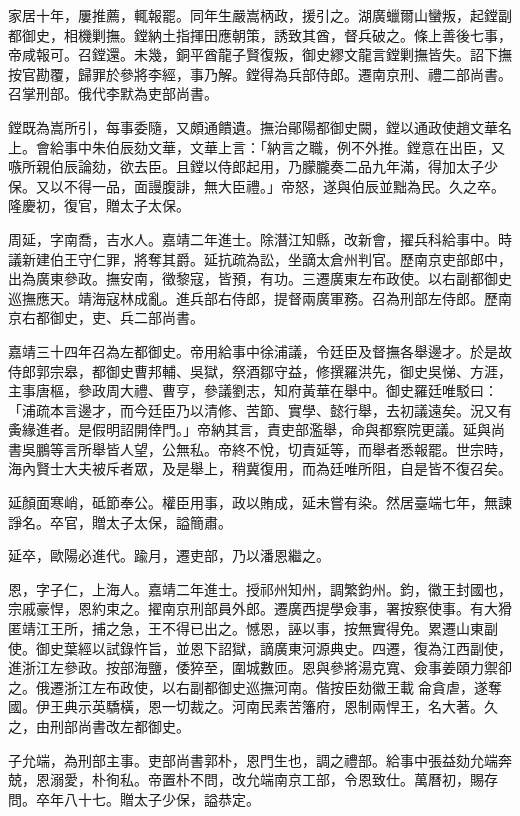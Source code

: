 \begin{pinyinscope}
家居十年，屢推薦，輒報罷。同年生嚴嵩柄政，援引之。湖廣蠟爾山蠻叛，起鏜副都御史，相機剿撫。鏜納土指揮田應朝策，誘致其酋，督兵破之。條上善後七事，帝咸報可。召鏜還。未幾，銅平酋龍子賢復叛，御史繆文龍言鏜剿撫皆失。詔下撫按官勘覆，歸罪於參將李經，事乃解。鏜得為兵部侍郎。遷南京刑、禮二部尚書。召掌刑部。俄代李默為吏部尚書。

鏜既為嵩所引，每事委隨，又頗通饋遺。撫治鄖陽都御史闕，鏜以通政使趙文華名上。會給事中朱伯辰劾文華，文華上言：「納言之職，例不外推。鏜意在出臣，又嗾所親伯辰論劾，欲去臣。且鏜以侍郎起用，乃朦朧奏二品九年滿，得加太子少保。又以不得一品，面謾腹誹，無大臣禮。」帝怒，遂與伯辰並黜為民。久之卒。隆慶初，復官，贈太子太保。

周延，字南喬，吉水人。嘉靖二年進士。除潛江知縣，改新會，擢兵科給事中。時議新建伯王守仁罪，將奪其爵。延抗疏為訟，坐謫太倉州判官。歷南京吏部郎中，出為廣東參政。撫安南，徵黎寇，皆預，有功。三遷廣東左布政使。以右副都御史巡撫應天。靖海寇林成亂。進兵部右侍郎，提督兩廣軍務。召為刑部左侍郎。歷南京右都御史，吏、兵二部尚書。

嘉靖三十四年召為左都御史。帝用給事中徐浦議，令廷臣及督撫各舉邊才。於是故侍郎郭宗皋，都御史曹邦輔、吳獄，祭酒鄒守益，修撰羅洪先，御史吳悌、方涯，主事唐樞，參政周大禮、曹亨，參議劉志，知府黃華在舉中。御史羅廷唯駁曰：「浦疏本言邊才，而今廷臣乃以清修、苦節、實學、懿行舉，去初議遠矣。況又有夤緣進者。是假明詔開倖門。」帝納其言，責吏部濫舉，命與都察院更議。延與尚書吳鵬等言所舉皆人望，公無私。帝終不悅，切責延等，而舉者悉報罷。世宗時，海內賢士大夫被斥者眾，及是舉上，稍冀復用，而為廷唯所阻，自是皆不復召矣。

延顏面寒峭，砥節奉公。權臣用事，政以賄成，延未嘗有染。然居臺端七年，無諫諍名。卒官，贈太子太保，謚簡肅。

延卒，歐陽必進代。踰月，遷吏部，乃以潘恩繼之。

恩，字子仁，上海人。嘉靖二年進士。授祁州知州，調繁鈞州。鈞，徽王封國也，宗戚豪悍，恩約束之。擢南京刑部員外郎。遷廣西提學僉事，署按察使事。有大猾匿靖江王所，捕之急，王不得已出之。憾恩，誣以事，按無實得免。累遷山東副使。御史葉經以試錄忤旨，並恩下詔獄，謫廣東河源典史。四遷，復為江西副使，進浙江左參政。按部海鹽，倭猝至，圍城數匝。恩與參將湯克寬、僉事姜頤力禦卻之。俄遷浙江左布政使，以右副都御史巡撫河南。偕按臣劾徽王載侖貪虐，遂奪國。伊王典示英驕橫，恩一切裁之。河南民素苦籓府，恩制兩悍王，名大著。久之，由刑部尚書改左都御史。

子允端，為刑部主事。吏部尚書郭朴，恩門生也，調之禮部。給事中張益劾允端奔兢，恩溺愛，朴徇私。帝置朴不問，改允端南京工部，令恩致仕。萬曆初，賜存問。卒年八十七。贈太子少保，謚恭定。


\end{pinyinscope}
